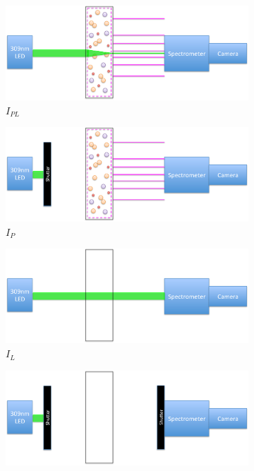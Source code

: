 \documentclass[11pt, oneside]{article}   	%
\begin{document}
\begin{figure}
	\begin{subfigure}{0.45\textwidth}
  	  	\includegraphics[width=\textwidth]{Figures/Ipl.pdf}
   	 	\caption{$I_{PL}$}
    		\label{subfig:Ipl}
	\end{subfigure}
	\hfill
	\begin{subfigure}{0.45\textwidth}
    		\includegraphics[width=\textwidth]{Figures/Ip.pdf}
    		\caption{$I_{P}$}
    		\label{subfig:Ip}
	\end{subfigure}
	\hfill
	\begin{subfigure}{0.45\textwidth}
		\includegraphics[width=\textwidth]{Figures/Il.pdf}
    		\caption{$I_{L}$}
		\label{subfig:Il}
	\end{subfigure}
	\hfill
    	\begin{subfigure}{0.45\textwidth}
    		\includegraphics[width=\textwidth]{Figures/Ibg.pdf}

\end{subfigure}
\end{figure}
\end{document}
